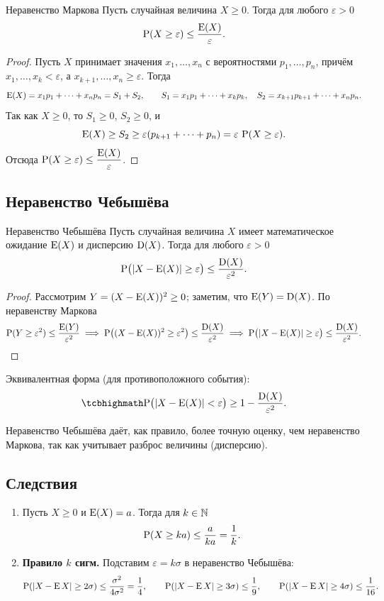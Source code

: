 \documentclass[11pt,a4paper]{article}
\begin{document}
\begin{kob}{Неравенство Маркова}
Пусть случайная величина $X\ge0$. Тогда для любого $\varepsilon>0$
\[
\P(X\ge\varepsilon)\le\frac{\E(X)}{\varepsilon}.
\]
\end{kob}

\begin{proof}
Пусть $X$ принимает значения $x_1,\dots,x_n$ с вероятностями $p_1,\dots,p_n$, причём $x_1,\dots,x_k<\varepsilon$,
а $x_{k+1},\dots,x_n\ge\varepsilon$. Тогда
\[
\E(X)=x_1p_1+\dots+x_np_n=S_1+S_2,\qquad S_1=x_1p_1+\dots+x_kp_k,\quad S_2=x_{k+1}p_{k+1}+\dots+x_np_n.
\]
Так как $X\ge0$, то $S_1\ge0$, $S_2\ge0$, и
\[
\E(X)\ge S_2\ge\varepsilon(p_{k+1}+\dots+p_n)=\varepsilon\,\P(X\ge\varepsilon).
\]
Отсюда $\P(X\ge\varepsilon)\le\dfrac{\E(X)}{\varepsilon}$.
\end{proof}

\subsection{Неравенство Чебышёва}

\begin{kob}{Неравенство Чебышёва}
Пусть случайная величина $X$ имеет математическое ожидание $\E(X)$ и дисперсию $\D(X)$. Тогда для любого $\varepsilon>0$
\[
\P\bigl(|X-\E(X)|\ge\varepsilon\bigr)\le\frac{\D(X)}{\varepsilon^2}.
\]
\end{kob}

\begin{proof}
Рассмотрим $Y=(X-\E(X))^2\ge0$; заметим, что $\E(Y)=\D(X)$. По неравенству Маркова
\[
\P(Y\ge\varepsilon^2)\le\frac{\E(Y)}{\varepsilon^2}
\;\Longrightarrow\;
\P\bigl((X-\E(X))^2\ge\varepsilon^2\bigr)\le\frac{\D(X)}{\varepsilon^2}
\;\Longrightarrow\;
\P\bigl(|X-\E(X)|\ge\varepsilon\bigr)\le\frac{\D(X)}{\varepsilon^2}.\qedhere
\]
\end{proof}

Эквивалентная форма (для противоположного события):
\[
\kbox{\P\bigl(|X-\E(X)|<\varepsilon\bigr)\ge1-\frac{\D(X)}{\varepsilon^2}.}
\]

\begin{zam}
Неравенство Чебышёва даёт, как правило, более точную оценку, чем неравенство Маркова,
так как учитывает разброс величины (дисперсию).
\end{zam}

\subsection{Следствия}
\begin{enumerate}
\item Пусть $X\ge0$ и $\E(X)=a$. Тогда для $k\in\NN$
\[
\P(X\ge ka)\le\frac{a}{ka}=\frac1k.
\]
\item \textbf{Правило $k$ сигм.} Подставим $\varepsilon=k\sigma$ в неравенство Чебышёва:
\[
\P(|X-\E X|\ge2\sigma)\le\frac{\sigma^2}{4\sigma^2}=\frac14,\qquad
\P(|X-\E X|\ge3\sigma)\le\frac19,\qquad
\P(|X-\E X|\ge4\sigma)\le\frac1{16}.
\]
\end{enumerate}
\end{document}
